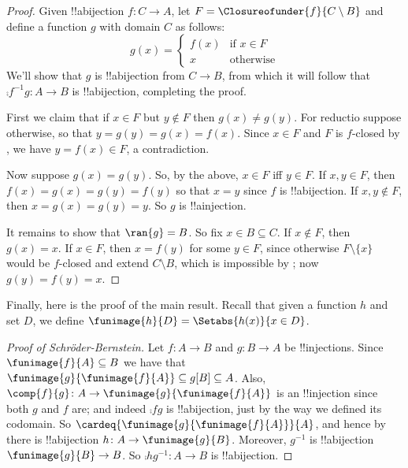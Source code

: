 \documentclass[../../../include/open-logic-section]{subfiles}
\begin{document}
\begin{proof}
Given !!a{bijection}  $f \colon C \to A$, let $F =
\Closureofunder{f}{C \setminus B}$ and define a function $g$ with
domain $C$ as follows:
\[
	g(x) = 
	\begin{cases}
			f(x) &\text{if $x \in F$}\\
			x & \text{otherwise}
		\end{cases}
\]
We'll show that $g$ is !!a{bijection} from $C \to B$, from which it
will follow that $\comp{f^{-1}}{g} \colon A \to B$ is !!a{bijection},
completing the proof.

First we claim that if $x \in F$ but $y\notin F$ then $g(x) \neq
g(y)$. For reductio suppose otherwise, so that $y = g(y) = g(x) =
f(x)$. Since $x \in F$ and $F$ is $f$-closed by ,
we have $y = f(x) \in F$, a contradiction. 

Now suppose $g(x) = g(y)$. So, by the above, $x \in F$ iff $y \in F$.
If $x, y \in F$, then $f(x) = g (x) = g(y) = f(y)$ so that $x = y$
since $f$ is !!a{bijection}. If  $x, y \notin F$, then $x = g(x) =
g(y) = y$. So $g$ is !!a{injection}.

It remains to show that $\ran{g} = B$. So fix $x \in B \subseteq C$.
If $x \notin F$, then $g(x) = x$. If $x \in F$, then $x = f(y)$ for
some $y \in F$, since otherwise $F \setminus \{x\}$ would be $f$-closed and extend $C\setminus B$, which is impossible by ; now $g(y) = f(y) = x$.
\end{proof}

Finally, here is the proof of the main result. Recall that given a
function $h$ and set $D$, we define $\funimage{h}{D} = \Setabs{h(x)}{x
\in D}$. 

\begin{proof}[Proof of Schr\"oder-Bernstein] Let $f \colon A \to B$
and $g \colon B \to A$ be !!{injection}s. Since $\funimage{f}{A}
\subseteq B$ we have that $\funimage{g}{\funimage{f}{A}} \subseteq
g[B] \subseteq A$. Also, $\comp{f}{g} \colon A \to
\funimage{g}{\funimage{f}{A}}$ is an !!{injection} since both $g$ and
$f$ are; and indeed $\comp{f}{g}$ is !!a{bijection}, just by the way
we defined its codomain. So
$\cardeq{\funimage{g}{\funimage{f}{A}}}{A}$, and hence by
 there is !!a{bijection} $h \colon A \to
\funimage{g}{B}$. Moreover, $g^{-1}$ is !!a{bijection}
$\funimage{g}{B} \to B$. So $\comp{h}{g^{-1}} \colon A \to B$ is
!!a{bijection}. 
\end{proof}
\end{document}

